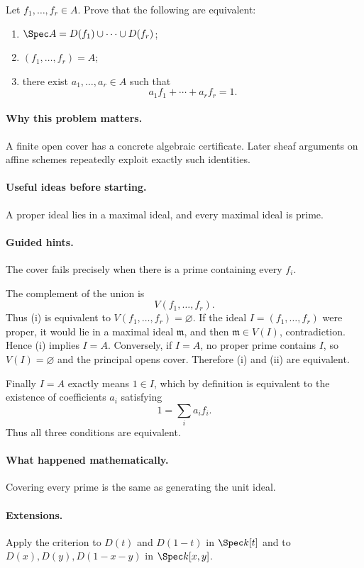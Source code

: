 \begin{problem}
Let $f_1,\dots,f_r\in A$.  Prove that the following are equivalent:
\begin{enumerate}[label=(\roman*)]
\item $\Spec A=D(f_1)\cup\cdots\cup D(f_r)$;
\item $(f_1,\dots,f_r)=A$;
\item there exist $a_1,\dots,a_r\in A$ such that
\[
a_1f_1+\cdots+a_rf_r=1.
\]
\end{enumerate}
\end{problem}

\paragraph{Why this problem matters.}
A finite open cover has a concrete algebraic certificate.  Later sheaf arguments on affine
schemes repeatedly exploit exactly such identities.

\paragraph{Useful ideas before starting.}
A proper ideal lies in a maximal ideal, and every maximal ideal is prime.

\paragraph{Guided hints.}
The cover fails precisely when there is a prime containing every $f_i$.

\begin{solution}
The complement of the union is
\[
V(f_1,\dots,f_r).
\]
Thus (i) is equivalent to $V(f_1,\dots,f_r)=\varnothing$.  If the ideal
$I=(f_1,\dots,f_r)$ were proper, it would lie in a maximal ideal $\mathfrak m$, and then
$\mathfrak m\in V(I)$, contradiction.  Hence (i) implies $I=A$.  Conversely, if $I=A$,
no proper prime contains $I$, so $V(I)=\varnothing$ and the principal opens cover.
Therefore (i) and (ii) are equivalent.

Finally $I=A$ exactly means $1\in I$, which by definition is equivalent to the existence of
coefficients $a_i$ satisfying
\[
1=\sum_i a_if_i.
\]
Thus all three conditions are equivalent.
\end{solution}

\paragraph{What happened mathematically.}
Covering every prime is the same as generating the unit ideal.

\paragraph{Extensions.}
Apply the criterion to $D(t)$ and $D(1-t)$ in $\Spec k[t]$ and to
$D(x),D(y),D(1-x-y)$ in $\Spec k[x,y]$.
